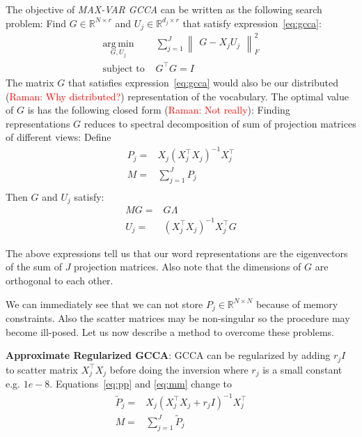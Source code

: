 \documentclass[11pt]{article}
\newcommand{\raman}[1]{ (\textcolor{red}{Raman: #1})}
\begin{document}
The objective of \emph{MAX-VAR GCCA} can be written as the following search problem:
 Find $G \in \mathbb{R}^{N\times r}$ and $U_j \in
\mathbb{R}^{d_j \times r}$ that satisfy expression~\ref{eq:gcca}:
\begin{equation}
  \label{eq:gcca}
\begin{split}
  \operatorname*{\arg\,\min}_{G,U_j} & \sum_{j=1}^J \begin{Vmatrix} G - X_jU_j \end{Vmatrix}^2_F \\
  \text{subject to } & G^\top G = I
\end{split}
\end{equation}
The matrix $G$ that satisfies expression~\ref{eq:gcca} would also be our
distributed\raman{Why distributed?} representation of the vocabulary.
The optimal value of $G$ is has the following closed form\raman{Not really}:
Finding representations $G$ reduces to spectral decomposition of sum of projection matrices of different views: Define
\begin{align}
P_j =& X_j(X_j^\top X_j)^{-1}X_j^\top \label{eq:pp}\\
M =& \sum_{j=1}^J P_j \label{eq:mm}\\
\end{align}
Then $G$ and $U_j$ satisfy:
\begin{align}
M G =& G \Lambda\\
U_j =& \left(X_j^\top X_j\right)^{-1} X_j^\top G
\end{align}

The above expressions tell us that our word representations are the
eigenvectors of the sum of $J$ projection matrices. Also note that the
dimensions of $G$ are orthogonal to each other. %

We can immediately see that we can not store
 $P_j \in \mathbb{R}^{N \times N}$ because of memory constraints.
Also the scatter matrices may be non-singular so the procedure may become
ill-posed. 
Let us now describe a method to overcome these problems.

\noindent\textbf{Approximate Regularized GCCA}: GCCA can be regularized by adding $r_jI$ to 
scatter matrix $X_j^\top X_j$ before doing the inversion where
$r_j$ is a small constant e.g. $1e-8$. Equations~\ref{eq:pp}
and \ref{eq:mm} change to
\begin{align}
  \widetilde{P}_{j} =& X_j(X_j^\top X_j+r_jI)^{-1}X_j^\top \label{eq:6}\\
  M =& \sum_{j=1}^J \widetilde{P}_{j} \label{eq:mmm}
\end{align}
\end{document}
